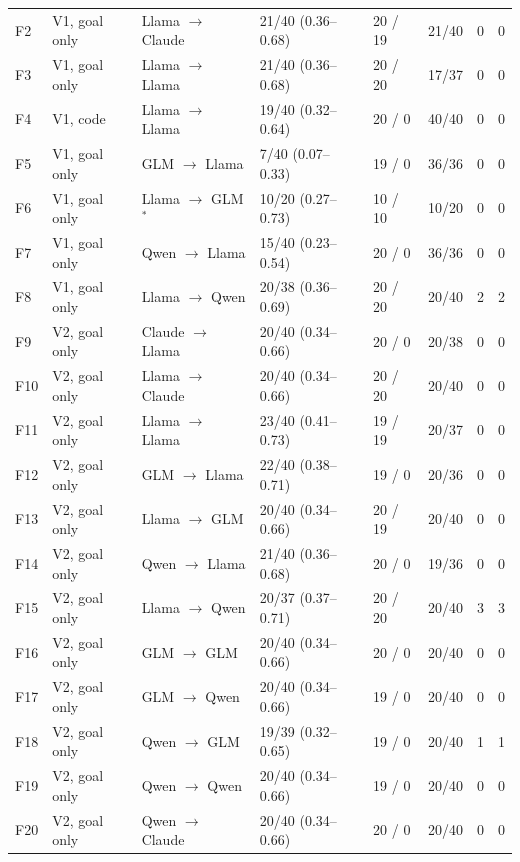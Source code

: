 \begin{table}[!ht]
\begin{tabularx}{\textwidth}{@{}l l Y l l l r r@{}}
F2 & V1, goal only & Llama $\to$ Claude & 21/40 (0.36--0.68) & 20 / 19 & 21/40 & 0 & 0 \\
F3 & V1, goal only & Llama $\to$ Llama & 21/40 (0.36--0.68) & 20 / 20 & 17/37 & 0 & 0 \\
F4 & V1, code & Llama $\to$ Llama & 19/40 (0.32--0.64) & 20 / 0 & 40/40 & 0 & 0 \\
F5 & V1, goal only & GLM $\to$ Llama & 7/40 (0.07--0.33) & 19 / 0 & 36/36 & 0 & 0 \\
F6 & V1, goal only & Llama $\to$ GLM$^{*}$ & 10/20 (0.27--0.73) & 10 / 10 & 10/20 & 0 & 0 \\
F7 & V1, goal only & Qwen $\to$ Llama & 15/40 (0.23--0.54) & 20 / 0 & 36/36 & 0 & 0 \\
F8 & V1, goal only & Llama $\to$ Qwen & 20/38 (0.36--0.69) & 20 / 20 & 20/40 & 2 & 2 \\
\midrule
F9 & V2, goal only & Claude $\to$ Llama & 20/40 (0.34--0.66) & 20 / 0 & 20/38 & 0 & 0 \\
F10 & V2, goal only & Llama $\to$ Claude & 20/40 (0.34--0.66) & 20 / 20 & 20/40 & 0 & 0 \\
F11 & V2, goal only & Llama $\to$ Llama & 23/40 (0.41--0.73) & 19 / 19 & 20/37 & 0 & 0 \\
F12 & V2, goal only & GLM $\to$ Llama & 22/40 (0.38--0.71) & 19 / 0 & 20/36 & 0 & 0 \\
F13 & V2, goal only & Llama $\to$ GLM & 20/40 (0.34--0.66) & 20 / 19 & 20/40 & 0 & 0 \\
F14 & V2, goal only & Qwen $\to$ Llama & 21/40 (0.36--0.68) & 20 / 0 & 19/36 & 0 & 0 \\
F15 & V2, goal only & Llama $\to$ Qwen & 20/37 (0.37--0.71) & 20 / 20 & 20/40 & 3 & 3 \\
F16 & V2, goal only & GLM $\to$ GLM & 20/40 (0.34--0.66) & 20 / 0 & 20/40 & 0 & 0 \\
F17 & V2, goal only & GLM $\to$ Qwen & 20/40 (0.34--0.66) & 19 / 0 & 20/40 & 0 & 0 \\
F18 & V2, goal only & Qwen $\to$ GLM & 19/39 (0.32--0.65) & 19 / 0 & 20/40 & 1 & 1 \\
F19 & V2, goal only & Qwen $\to$ Qwen & 20/40 (0.34--0.66) & 19 / 0 & 20/40 & 0 & 0 \\
F20 & V2, goal only & Qwen $\to$ Claude & 20/40 (0.34--0.66) & 20 / 0 & 20/40 & 0 & 0 \\
\bottomrule
\end{tabularx}
\end{table}
